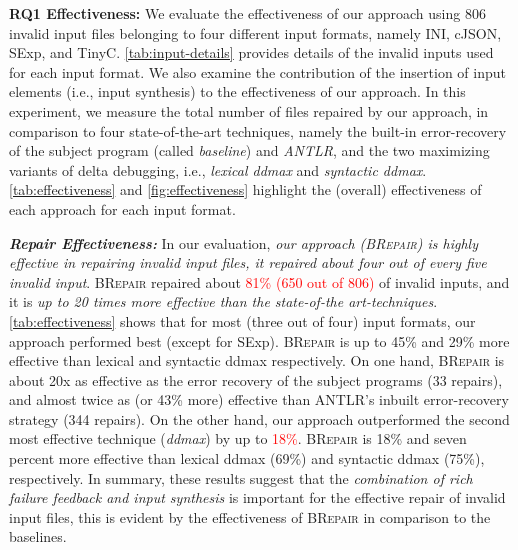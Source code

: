 \documentclass[sigconf,review,anonymous]{acmart}
\newcounter{todocounter}
\newcommand{\todo}[1]{\marginpar{$|$}\textcolor{red}{\stepcounter{todocounter}\footnote[\thetodocounter]{\textcolor{red}{\textbf{TODO }}\textit{#1}}}}
\newcommand{\recheck}[1]{\textcolor{red}{#1}}
\renewcommand{\todo}[1]{}
\newcommand{\approach}{\textsc{BRepair}\xspace}
\begin{document}
\noindent
\textbf{RQ1 Effectiveness:} 
We evaluate the effectiveness of our approach using 806 invalid input files belonging to four different input formats, namely INI, cJSON, SExp, and TinyC.  \autoref{tab:input-details} provides details of the %
invalid inputs used for each input format. 
We also examine the contribution of the insertion  of input elements (i.e., input synthesis) to the effectiveness of our approach. 
In this experiment, 
we measure the total number of files repaired by our approach, in comparison to 
four state-of-the-art techniques,  
namely the built-in error-recovery of the subject program (called \textit{baseline}) and \textit{ANTLR}, and %
the two maximizing variants of delta debugging, i.e., \textit{lexical ddmax} and \textit{syntactic ddmax}.   \autoref{tab:effectiveness} and \autoref{fig:effectiveness} highlight the (overall) effectiveness of each approach %
for each input format. 



\noindent \textbf{\textit{Repair Effectiveness:}} In our evaluation, %
\textit{our approach (\approach) is highly effective in repairing invalid input files, it repaired about four out of every five invalid input}. \approach repaired about \recheck{81\% (650 out of 806)} of invalid inputs, and it is \textit{up to 20 times more effective than %
the state-of-the art-techniques}. 
\autoref{tab:effectiveness} 
shows that for most (three out of four) input formats, our approach performed best (except for SExp).  \approach is up to 45\% and 29\% more effective than lexical and syntactic ddmax %
respectively.  
On one hand, \approach is about 20x as effective as the error recovery of the subject programs (33 repairs), and almost twice as (or 43\% more) effective than ANTLR's inbuilt error-recovery strategy (344 repairs). On the other hand, our approach outperformed the second most effective technique (\textit{ddmax}) by up to \recheck{18\%}. \approach is 18\% and seven percent more effective than lexical ddmax (69\%) and syntactic ddmax (75\%), respectively. 
In summary, these results suggest that %
the \textit{combination of rich failure feedback and input synthesis} is important for the effective repair of invalid input files, this is evident by the effectiveness of \approach in comparison to the baselines.  
\end{document}
